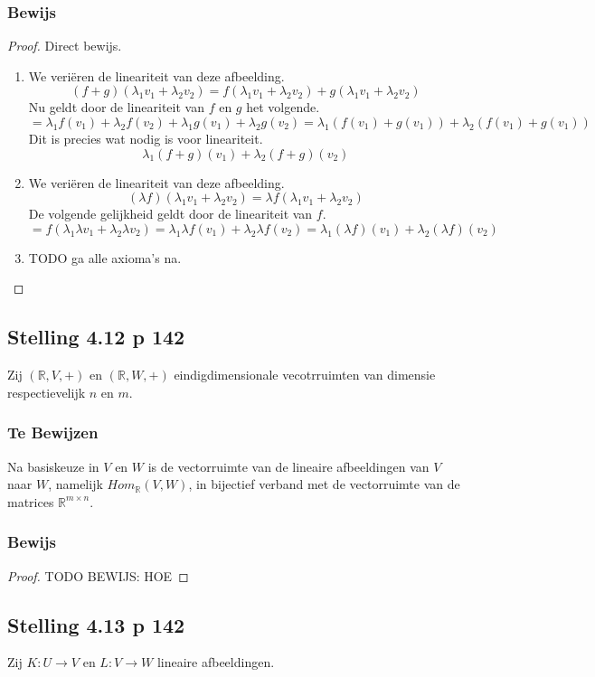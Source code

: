 \documentclass[lineaire_algebra_oplossingen.tex]{subfiles}
\begin{document}
\subsubsection*{Bewijs}
\begin{proof}
Direct bewijs.
\begin{enumerate}
\item
We veri\"eren de lineariteit van deze afbeelding.
\[
(f+g)(\lambda_1v_1+\lambda_2v_2) = f(\lambda_1v_1+\lambda_2v_2) + g(\lambda_1v_1+\lambda_2v_2)
\]
Nu geldt door de lineariteit van $f$ en $g$ het volgende.
\[
= \lambda_1f(v_1)+\lambda_2f(v_2) + \lambda_1g(v_1)+\lambda_2g(v_2) = \lambda_1(f(v_1)+g(v_1)) + \lambda_2(f(v_1)+g(v_1))
\]
Dit is precies wat nodig is voor lineariteit.
\[
\lambda_1(f+g)(v_1)+\lambda_2(f+g)(v_2)
\]
\item
We veri\"eren de lineariteit van deze afbeelding.
\[
(\lambda f)(\lambda_1v_1+\lambda_2v_2) = \lambda f(\lambda_1v_1+\lambda_2v_2)
\]
De volgende gelijkheid geldt door de lineariteit van $f$. 
\[
=  f(\lambda_1\lambda v_1+\lambda_2\lambda v_2) = \lambda_1\lambda f(v_1)+\lambda_2\lambda f(v_2) = 
\lambda_1(\lambda f)(v_1)+\lambda_2(\lambda f)(v_2)
\]
\item
TODO ga alle axioma's na.
\end{enumerate}
\end{proof}

\subsection{Stelling 4.12 p 142}
Zij $(\mathbb{R},V,+)$ en  $(\mathbb{R},W,+)$ eindigdimensionale vecotrruimten van dimensie respectievelijk $n$ en $m$.
\subsubsection*{Te Bewijzen}
Na basiskeuze in $V$ en $W$ is de vectorruimte van de lineaire afbeeldingen van $V$ naar $W$, namelijk $Hom_{\mathbb{R}}(V,W)$, in bijectief verband met de vectorruimte van de matrices $\mathbb{R}^{m\times n}$.
\subsubsection*{Bewijs}
\begin{proof}
TODO BEWIJS: HOE
\end{proof}

\subsection{Stelling 4.13 p 142}
Zij $K:U\rightarrow V$ en $L:V\rightarrow W$ lineaire afbeeldingen.
\end{document}
